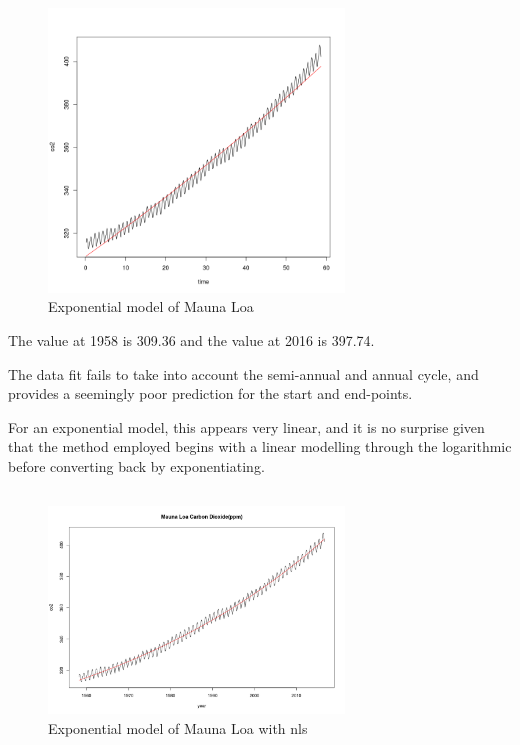 \documentclass[paper=a4, fontsize=11pt]{scrartcl}
\numberwithin{equation}{section} %
\numberwithin{figure}{section} %
\numberwithin{table}{section} %
\begin{document}
\subsection{}
\begin{figure}[htp]
	\centering
	\includegraphics[width=0.7\textwidth, clip]{q4b.png} 
	\caption{Exponential model of Mauna Loa}
\end{figure}

The value at 1958 is 309.36 and the value at 2016 is 397.74.

The data fit fails to take into account the semi-annual and annual cycle, and provides a seemingly poor prediction for the start and end-points.

For an exponential model, this appears very linear, and it is no surprise given that the method employed begins with a linear modelling through the logarithmic before converting back by exponentiating.
\pagebreak
\subsection{}
\begin{figure}[htp]
	\centering
	\includegraphics[width=0.7\textwidth, clip]{q4c.png} 
	\caption{Exponential model of Mauna Loa with nls}
\end{figure}
\end{document}
